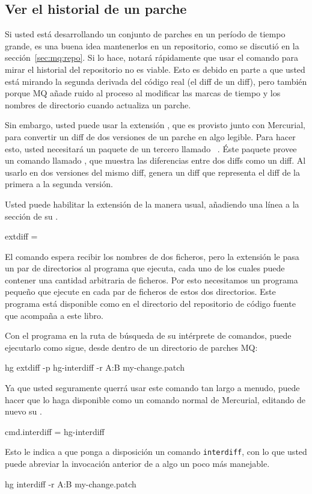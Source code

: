 \subsection{Ver el historial de un parche}
\label{mq-collab:tips:interdiff}

Si usted está desarrollando un conjunto de parches en un período de
tiempo grande, es una buena idea mantenerlos en un repositorio, como
se discutió en la sección~\ref{sec:mq:repo}.  Si lo hace, notará
rápidamente que usar el comando  para mirar el historial
del repositorio no es viable. Esto es debido en parte a que usted está
mirando la segunda derivada del código real (el diff de un diff), pero
también porque MQ añade ruido al proceso al modificar las marcas de
tiempo y los nombres de directorio cuando actualiza un parche.

Sin embargo, usted puede usar la extensión , que es
provisto junto con Mercurial, para convertir un diff de dos versiones
de un parche en algo legible. Para hacer esto, usted necesitará un
paquete de un tercero llamado
~\cite{web:patchutils}.  Éste paquete provee un
comando llamado , que muestra las diferencias entre
dos diffs como un diff. Al usarlo en dos versiones del mismo diff,
genera un diff que representa el diff de la primera a la segunda
versión.

Usted puede habilitar la extensión  de la manera usual,
añadiendo una línea a la sección  de su \hgrc.
\begin{codesample2}
  [extensions]
  extdiff =
\end{codesample2}
El comando   espera recibir los nombres de dos
ficheros, pero la extensión  le pasa un par de
directorios al programa que ejecuta, cada uno de los cuales puede
contener una cantidad arbitraria de ficheros. Por esto necesitamos un
programa pequeño que ejecute  en cada par de
ficheros de estos dos directorios. Este programa está disponible como
 en el directorio  del
repositorio de código fuente que acompaña a este libro.

Con el programa  en la ruta de búsqueda de su
intérprete de comandos, puede ejecutarlo como sigue, desde dentro de
un directorio de parches MQ:
\begin{codesample2}
  hg extdiff -p hg-interdiff -r A:B my-change.patch
\end{codesample2}
Ya que usted seguramente querrá usar este comando tan largo a menudo,
puede hacer que  lo haga disponible como un comando
normal de Mercurial, editando de nuevo su \hgrc.
\begin{codesample2}
  [extdiff]
  cmd.interdiff = hg-interdiff
\end{codesample2}
Esto le indica a  que ponga a disposición un comando
\texttt{interdiff}, con lo que usted puede abreviar la invocación
anterior de  a algo un poco más manejable.
\begin{codesample2}
  hg interdiff -r A:B my-change.patch
\end{codesample2}

